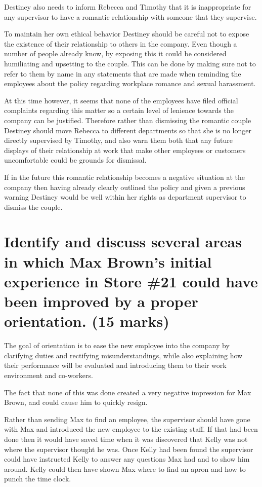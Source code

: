 \documentclass[12pt,titlepage]{article}
\begin{document}
Destiney also needs to inform Rebecca and Timothy that it is inappropriate for any supervisor to have a romantic relationship with someone that they supervise. 

To maintain her own ethical behavior Destiney should be careful not to expose the existence of their relationship to others in the company. Even though a number of people already know, by exposing this it could be considered humiliating and upsetting to the couple. This can be done by making sure not to refer to them by name in any statements that are made when reminding the employees about the policy regarding workplace romance and sexual harassment. 

At this time however, it seems that none of the employees have filed official complaints regarding this matter so a certain level of lenience towards the company can be justified. Therefore rather than dismissing the romantic couple Destiney should move Rebecca to different departments so that she is no longer directly supervised by Timothy, and also warn them both that any future displays of their relationship at work that make other employees or customers uncomfortable could be grounds for dismissal.

If in the future this romantic relationship becomes a negative situation at the company then having already clearly outlined the policy and given a previous warning Destiney would be well within her rights as department supervisor to dismiss the couple. 

\section{Identify and discuss several areas in which Max Brown's initial experience in Store \#21 could have been improved by a proper orientation. (15 marks)}

The goal of orientation is to ease the new employee into the company by clarifying duties and rectifying misunderstandings, while also explaining how their performance will be evaluated and introducing them to their work environment and co-workers. 

The fact that none of this was done created a very negative impression for Max Brown, and could cause him to quickly resign. 

Rather than sending Max to find an employee, the supervisor should have gone with Max and introduced the new employee to the existing staff. If that had been done then it would have saved time when it was discovered that Kelly was not where the supervisor thought he was. Once Kelly had been found the supervisor could have instructed Kelly to answer any questions Max had and to show him around. Kelly could then have shown Max where to find an apron and how to punch the time clock. 
\end{document}
